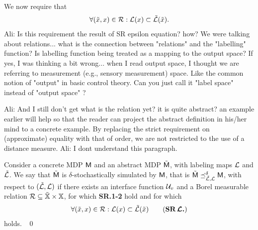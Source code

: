 \documentclass{ifacconf}
\renewcommand{\axx}[1]{{\color{orange} Ali: #1}}
\begin{document}
We now require that \begin{equation}
  \forall (\tilde x,x )\in \mathcal{R}:  \mathcal{L}(x)\subset \tilde{\mathcal{L}}(\tilde x).
  \end{equation} 
  \axx{Is this requirement the result of SR epsilon equation? how? We were talking about relations... what is the connection between "relations" and the "labelling" function? Is labelling function being treated as a mapping to the output space? If yes, I was thinking a bit wrong... when I read output space, I thought we are referring to measurement (e.g., sensory measurement) space. Like the common notion of "output" in basic control theory. Can you just call it "label space" instead of "output space" ?}

\axx{And I still don't get what is the relation yet? it is quite abstract? an example earlier will help so that the reader can project the abstract definition in his/her mind to a concrete example.}
By replacing the strict requirement on (approximate) equality with that of order,   we are not restricted to the use of a distance measure. %
\axx{I dont understand this paragraph.}
 
 
 
\begin{definition}\label{def:apbsim}
Consider a concrete MDP $\mathsf{M}$ and an abstract  MDP $\tilde{\mathsf{M}}$, with labeling maps $\mathcal{L}$ and  $\tilde{\mathcal{L}}$.   
We say that	$\tilde{\mathsf{M}}$ is $\delta$-stochastically simulated by $\mathsf{M}$, that is $\tilde{\mathsf{M}}\preceq^{\delta}_{\tilde{\mathcal{L}},\mathcal{L}}\mathsf{M}$, with respect to $(\tilde{\mathcal{L}},\mathcal{L})$  if there exists an interface function $\mathcal{U}_{v}$ and
	a Borel measurable relation $\mathcal{R}\subseteq \tilde {{\mathbb{X}}}\times {\mathbb{X}}$, for which \textbf{SR.1-2} hold and for which 	\begin{equation}
	  \forall (\tilde x,x)\in \rel:  \Labset(x)\subset \tilde{\Labset}(\tilde x)
\tag{\textbf{SR$\,\boldsymbol{\CA{L}}$.}}
	\end{equation} 
holds. \hfill\mbox{ }\qed
\end{definition}
\end{document}
